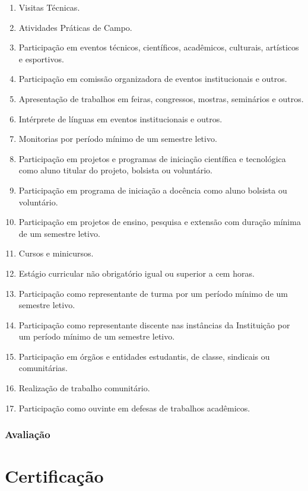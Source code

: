 \documentclass[11pt,fleqn]{book} %
\begin{document}
\begin{enumerate}
	\item Visitas Técnicas.
	\item Atividades Práticas de Campo.
	\item Participação em eventos técnicos, científicos, acadêmicos, culturais, artísticos e esportivos.
	\item Participação em comissão organizadora de eventos institucionais e outros.
	\item Apresentação de trabalhos em feiras, congressos, mostras, seminários e outros.
	\item Intérprete de línguas em eventos institucionais e outros.
	\item Monitorias por período mínimo de um semestre letivo.
	\item Participação em projetos e programas de iniciação científica e tecnológica como aluno titular do projeto, bolsista ou voluntário.
	\item Participação em programa de iniciação a docência como aluno bolsista ou voluntário.
	\item Participação em projetos de ensino, pesquisa e extensão com duração mínima de um semestre letivo.
	\item Cursos e minicursos.
	\item Estágio curricular não obrigatório igual ou superior a cem horas.
	\item Participação como representante de turma por um período mínimo de um semestre letivo.
	\item Participação como representante discente nas instâncias da Instituição por um período mínimo de um semestre letivo.
	\item Participação em órgãos e entidades estudantis, de classe, sindicais ou comunitárias.
	\item Realização de trabalho comunitário.
	\item Participação como ouvinte em defesas de trabalhos acadêmicos.
\end{enumerate}


\subsubsection{Avaliação}


\section{Certificação}
\end{document}
